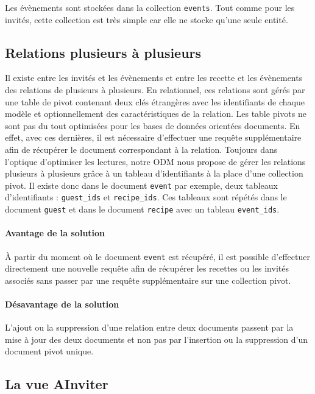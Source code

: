 		Les évènements sont stockées dans la collection \verb|events|. Tout comme pour les invités, cette collection est très simple car elle ne stocke qu'une seule entité.

	\subsection{Relations plusieurs à plusieurs}

		Il existe entre les invités et les évènements et entre les recette et les évènements des relations de plusieurs à plusieurs. En relationnel, ces relations sont gérés par une table de pivot contenant deux clés étrangères avec les identifiants de chaque modèle et optionnellement des caractéristiques de la relation. Les table pivots ne sont pas du tout optimisées pour les bases de données orientées documents. En effet, avec ces dernières, il est nécessaire d'effectuer une requête supplémentaire afin de récupérer le document correspondant à la relation. Toujours dans l'optique d'optimiser les lectures, notre ODM nous propose de gérer les relations plusieurs à plusieurs grâce à un tableau d'identifiants à la place d'une collection pivot. Il existe donc dans le document \verb|event| par exemple, deux tableaux d'identifiants : \verb|guest_ids| et \verb|recipe_ids|. Ces tableaux sont répétés dans le document \verb|guest| et dans le document \verb|recipe| avec un tableau \verb|event_ids|.

		\paragraph{Avantage de la solution}%
			À partir du moment où le document \verb|event| est récupéré, il est possible d'effectuer directement une nouvelle requête afin de récupérer les recettes ou les invités associés sans passer par une requête supplémentaire sur une collection pivot.

		\paragraph{Désavantage de la solution}%
			L'ajout ou la suppression d'une relation entre deux documents passent par la mise à jour des deux documents et non pas par l'insertion ou la suppression d'un document pivot unique.

	\subsection{La vue AInviter}

